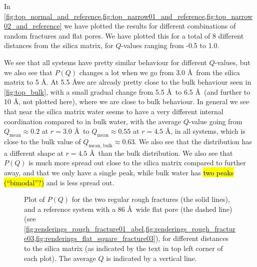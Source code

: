In \cref{fig:top_normal_and_reference,fig:top_narrow01_and_reference,fig:top_narrow02_and_reference} we have plotted the results for different combinations of random fractures and flat pores. We have plotted this for a total of %
8 %
different distances from the silica matrix, for $Q$-values ranging from -0.5 to 1.0. 

We see that all systems have pretty similar behaviour for different $Q$-values, but we also see that $P(Q)$ changes a lot when we go from 3.0 \AA\ from the silica matrix to 5 \AA. At 5.5 \AA we are already pretty close to the bulk behaviour seen in \cref{fig:top_bulk}, with a small gradual change from 5.5 \AA\ to 6.5 \AA\ (and further to 10 \AA, not plotted here), where we are close to bulk behaviour. In general we see that near the silica matrix water seems to have a very different internal coordination compared to in bulk water, with the average $Q$-value going from $Q_\text{mean} \approx 0.2$ at $r = 3.0$ \AA\ to $Q_\text{mean} \approx 0.55$ at $r = 4.5$ \AA, in all systems, which is close to the bulk value of $Q_\text{mean, bulk} \approx 0.63$. We also see that the distribution has a different shape at $r = 4.5$ \AA\ than the bulk distribution. We also see that $P(Q)$ is much more spread out close to the silica matrix compared to further away, and that we only have a single peak, while bulk water has \hl{two peaks (``bimodal''?)} and is less spread out.

%
\begin{figure}[!p]%
    \centering%
    {%
        \captionsetup{width=\textwidth}%
        \caption{%
            Plot of $P(Q)$ for the two regular rough fractures (the solid lines), and a reference system with a 86 \AA\ wide flat pore (the dashed line) (see \cref{fig:renderings_rough_fracture01_abel,fig:renderings_rough_fracture03,fig:renderings_flat_square_fracture03}), for different distances to the silica matrix (as indicated by the text in top left corner of each plot). The average $Q$ is indicated by a vertical line. %
            \label{fig:top_normal_and_reference}%
            \label{fig:first_top_figure}%
        }%
    }%
\end{figure}%

